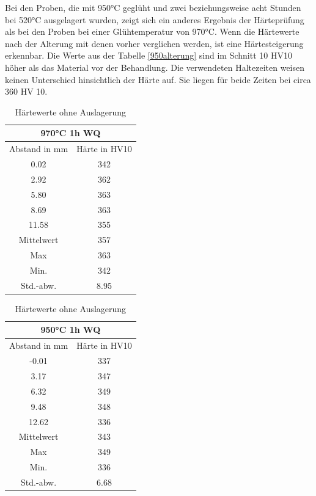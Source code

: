 \documentclass[a4paper, 11pt]{tubsreprt}
\begin{document}
Bei den Proben, die mit 950°C geglüht und zwei beziehungsweise acht Stunden bei 520°C ausgelagert wurden, zeigt sich ein anderes Ergebnis der Härteprüfung als bei den Proben bei einer Glühtemperatur von 970°C. Wenn die Härtewerte nach der Alterung mit denen vorher verglichen werden, ist eine Härtesteigerung erkennbar. Die Werte aus der Tabelle \ref{950alterung} sind im Schnitt 10 HV10 höher als das Material vor der Behandlung. Die verwendeten Haltezeiten weisen keinen Unterschied hinsichtlich der Härte auf. Sie liegen für beide Zeiten bei circa 360 HV 10.
\begin{table}[t]	%
\begin{tabular}{c|c}
\multicolumn{2}{c}{970°C 1h WQ} \\
\hline 
Abstand in mm	& Härte in HV10 \\
0.02	& 342\\
2.92	& 362\\
5.80	& 363\\
8.69	& 363 \\
11.58	& 355\\
\hline
Mittelwert	& 357 \\
Max	& 363 \\
Min.	& 342 \\
Std.-abw. &	8.95 \\

\end{tabular}
\begin{tabular}{c|c}
\multicolumn{2}{c}{950°C 1h WQ} \\
\hline 	
Abstand in mm	& 	Härte in HV10 \\
-0.01	&	337 \\
3.17	&	347 \\
6.32	&	349 \\
9.48	&	348 \\ 
12.62	&	336 \\
\hline
Mittelwert &	343 \\
Max	&	349 \\
Min.	&	336 \\
Std.-abw.	&	6.68 \\

\end{tabular}
\caption{Härtewerte ohne Auslagerung}
\label{Hearte ohne Behandlung}
\end{table}
\end{document}
